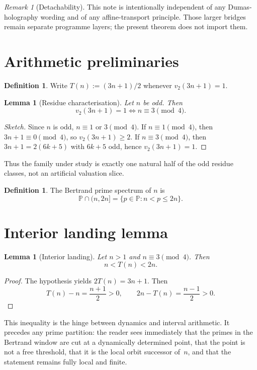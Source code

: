 \documentclass[11pt,a4paper]{article}
\newtheorem{lemma}[theorem]{Lemma}
\theoremstyle{definition}
\newtheorem{definition}[theorem]{Definition}
\theoremstyle{remark}
\newtheorem{remark}[theorem]{Remark}
\newcommand{\TT}{T}
\begin{document}
\begin{remark}[Detachability]
This note is intentionally independent of any Dumas-holography wording and
of any affine-transport principle. Those larger bridges remain separate
programme layers; the present theorem does not import them.
\end{remark}

\section{Arithmetic preliminaries}

\begin{definition}
Write $\TT(n):=(3n+1)/2$ whenever $v_2(3n+1)=1$.
\end{definition}

\begin{lemma}[Residue characterisation]
\label{lem:val-mod}
Let $n$ be odd. Then
\[
v_2(3n+1)=1 \iff n\equiv 3\pmod{4}.
\]
\end{lemma}
\begin{proof}[Sketch]
Since $n$ is odd, $n\equiv 1$ or $3\pmod{4}$. If $n\equiv 1\pmod{4}$, then
$3n+1\equiv 0\pmod{4}$, so $v_2(3n+1)\ge 2$. If $n\equiv 3\pmod{4}$, then
$3n+1=2(6k+5)$ with $6k+5$ odd, hence $v_2(3n+1)=1$.
\end{proof}
Thus the family under study is exactly one natural half of the odd
residue classes, not an artificial valuation slice.

\begin{definition}
The Bertrand prime spectrum of $n$ is
\[
\mathbb{P}\cap(n,2n]
=
\{p\in\mathbb{P}: n<p\le 2n\}.
\]
\end{definition}

\section{Interior landing lemma}

\begin{lemma}[Interior landing]
\label{lem:interior}
Let $n>1$ and $n\equiv 3\pmod{4}$. Then
\[
n<\TT(n)<2n.
\]
\end{lemma}
\begin{proof}
The hypothesis yields $2\TT(n)=3n+1$. Then
\[
\TT(n)-n=\frac{n+1}{2}>0,
\qquad
2n-\TT(n)=\frac{n-1}{2}>0.
\]
\end{proof}
This inequality is the hinge between dynamics and interval arithmetic. It
precedes any prime partition: the reader sees immediately that the primes
in the Bertrand window are cut at a dynamically determined point, that the
point is not a free threshold, that it is the local orbit successor of~$n$,
and that the statement remains fully local and finite.
\end{document}
